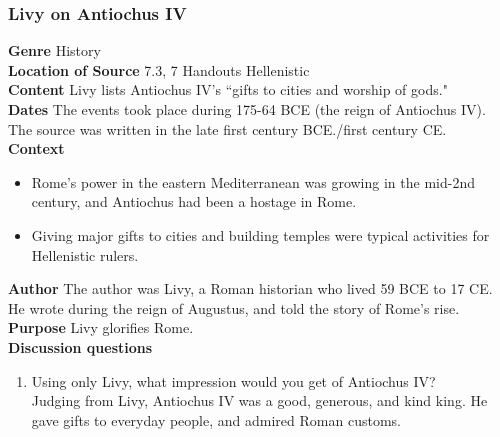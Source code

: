 \documentclass{article}
\begin{document}
\subsubsection*{Livy on Antiochus IV}
\textbf{Genre}
History \\
\textbf{Location of Source}
7.3, 7 Handouts Hellenistic \\
\textbf{Content}
Livy lists Antiochus IV’s “gifts to cities and worship of gods." \\
\textbf{Dates}
The events took place during 175-64 BCE (the reign of Antiochus IV).  The source was
written in the late first century BCE./first century CE. \\
\textbf{Context}
\begin{itemize}
  \item Rome’s power in the eastern Mediterranean was growing in the mid-2nd century,
  and Antiochus had been a hostage in Rome.
  \item Giving major gifts to cities and building temples were typical activities for
  Hellenistic rulers.
\end{itemize}
\textbf{Author}
The author was Livy,  a Roman historian who lived 59 BCE to 17 CE. He wrote during the
reign of Augustus, and told the story of Rome’s rise. \\
\textbf{Purpose}
Livy glorifies Rome. \\
\textbf{Discussion questions}
\begin{enumerate}
  \item Using only Livy, what impression would you get of Antiochus IV? \\
  Judging from Livy, Antiochus IV was a good, generous, and kind king. He gave gifts to
  everyday people, and admired Roman customs.
\end{enumerate}
\end{document}
